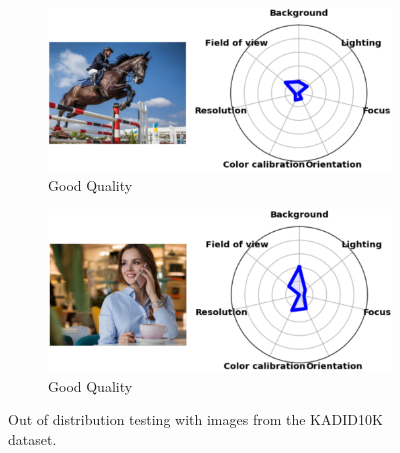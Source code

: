 \begin{figure}[ht]
    \begin{subfigure}[b]{0.48\textwidth}
        \includegraphics[width=\textwidth]{img/ood/3.png}
        \caption{Good Quality}
        \label{fig:3}
    \end{subfigure}
    \hfill
    \begin{subfigure}[b]{0.48\textwidth}
        \includegraphics[width=\textwidth]{img/ood/5.png}
        \caption{Good Quality}
        \label{fig:5}
    \end{subfigure}
    \caption{Out of distribution testing with images from the KADID10K dataset.}
    \label{fig:ood1}
\end{figure}

